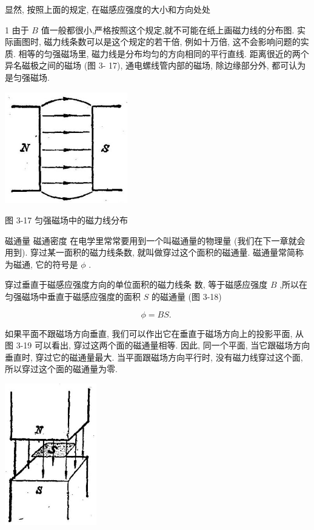 \documentclass[10pt]{article}
\begin{document}
显然, 按照上面的规定, 在磁感应强度的大小和方向处处

1 由于 \(B\) 值一般都很小,严格按照这个规定,就不可能在纸上画磁力线的分布图. 实际画图时, 磁力线条数可以是这个规定的若干倍, 例如十万倍, 这不会影响问题的实质. 相等的匀强磁场里, 磁力线是分布均匀的方向相同的平行直线. 距离很近的两个异名磁极之间的磁场 (图 3- 17), 通电螺线管内部的磁场, 除边缘部分外, 都可认为是匀强磁场.

\begin{center}
\includegraphics[max width=0.4\textwidth]{images/01913056-1f15-74d8-9184-9aab52c9d66b_113_190237.jpg}
\end{center}

图 3-17 匀强磁场中的磁力线分布

磁通量 磁通密度 在电学里常常要用到一个叫磁通量的物理量 (我们在下一章就会用到). 穿过某一面积的磁力线条数, 就叫做穿过这个面积的磁通量. 磁通量常简称为磁通, 它的符号是 \(\phi\) .

穿过垂直于磁感应强度方向的单位面积的磁力线条 数, 等于磁感应强度 \(B\) ,所以在匀强磁场中垂直于磁感应强度的面积 \(S\) 的磁通量 (图 3-18)

\[
\phi = {BS}\text{. }
\]

如果平面不跟磁场方向垂直, 我们可以作出它在垂直于磁场方向上的投影平面, 从图 3-19 可以看出, 穿过这两个面的磁通量相等. 因此, 同一个平面, 当它跟磁场方向垂直时, 穿过它的磁通量最大. 当平面跟磁场方向平行时, 没有磁力线穿过这个面, 所以穿过这个面的磁通量为零.

\begin{center}
\includegraphics[max width=0.3\textwidth]{images/01913056-1f15-74d8-9184-9aab52c9d66b_113_646066.jpg}
\end{center}
\end{document}

